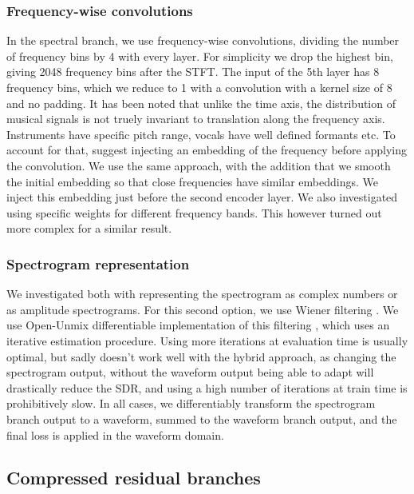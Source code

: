 \documentclass[10pt,a4paper,onecolumn]{article}
\begin{document}
\hypertarget{frequency-wise-convolutions}{%
\subsubsection{Frequency-wise
convolutions}\label{frequency-wise-convolutions}}

In the spectral branch, we use frequency-wise convolutions, dividing the
number of frequency bins by 4 with every layer. For simplicity we drop
the highest bin, giving 2048 frequency bins after the STFT. The input of
the 5th layer has 8 frequency bins, which we reduce to 1 with a
convolution with a kernel size of 8 and no padding. It has been noted
that unlike the time axis, the distribution of musical signals is not
truely invariant to translation along the frequency axis. Instruments
have specific pitch range, vocals have well defined formants etc. To
account for that, \citet{zemb} suggest injecting an embedding of the
frequency before applying the convolution. We use the same approach,
with the addition that we smooth the initial embedding so that close
frequencies have similar embeddings. We inject this embedding just
before the second encoder layer. We also investigated using specific
weights for different frequency bands. This however turned out more
complex for a similar result.

\hypertarget{spectrogram-representation}{%
\subsubsection{Spectrogram
representation}\label{spectrogram-representation}}

We investigated both with representing the spectrogram as complex
numbers \citep{cac} or as amplitude spectrograms. For this second
option, we use Wiener filtering \citep{wiener}. We use Open-Unmix
differentiable implementation of this filtering \citep{umx}, which uses
an iterative estimation procedure. Using more iterations at evaluation
time is usually optimal, but sadly doesn't work well with the hybrid
approach, as changing the spectrogram output, without the waveform
output being able to adapt will drastically reduce the SDR, and using a
high number of iterations at train time is prohibitively slow. In all
cases, we differentiably transform the spectrogram branch output to a
waveform, summed to the waveform branch output, and the final loss is
applied in the waveform domain.

\hypertarget{compressed-residual-branches}{%
\subsection{Compressed residual
branches}\label{compressed-residual-branches}}
\end{document}
